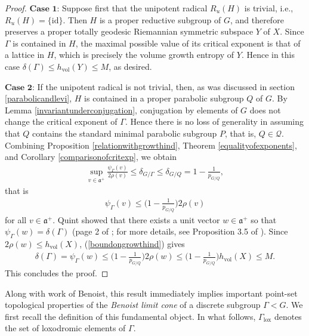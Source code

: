 \documentclass[psamsfonts]{amsart}
\theoremstyle{definition}
\theoremstyle{remark}
\numberwithin{equation}{section}
\begin{document}
\begin{proof}
\par 
$\textbf{Case 1:}$ Suppose first that the unipotent radical $R_{u}(H)$ is trivial, i.e., $R_{u}(H) = \{\mathrm{id}\}$. Then $H$ is a proper reductive subgroup of $G$, and therefore preserves a proper totally geodesic Riemannian symmetric subspace $Y$ of $X$. Since $\Gamma$ is contained in $H$, the maximal possible value of its critical exponent is that of a lattice in $H$, which is precisely the volume growth entropy of $Y$. Hence in this case $\delta(\Gamma) \leq h_{\mathrm{vol}}(Y) \leq M$, as desired.
\par 
$\textbf{Case 2:}$ If the unipotent radical is not trivial, then, as was discussed in section \ref{parabolicandlevi}, $H$ is contained in a proper parabolic subgroup $Q$ of $G$. By Lemma \ref{invariantunderconjugation}, conjugation by elements of $G$ does not change the critical exponent of $\Gamma$. Hence there is no loss of generality in assuming that $Q$ contains the standard minimal parabolic subgroup $P$, that is, $Q \in \mathcal{Q}$. Combining Proposition \ref{relationwithgrowthind}, Theorem \ref{equalityofexponents}, and Corollary \ref{comparisonofcritexp}, we obtain
\begin{align*}
\sup_{v \in \mathfrak{a}^{+}} \frac{\psi_{\Gamma}(v)}{2 \rho (v)} \leq \delta_{G/\Gamma} \leq \delta_{G/Q} = 1 - \frac{1}{p_{G/Q}},
\end{align*} that is
\begin{align}
\label{boundongrowthind}
\psi_{\Gamma}(v) \leq \Big(1 - \frac{1}{p_{G/Q}} \Big) 2 \rho(v)
\end{align} for all $v \in \mathfrak{a}^{+}$. Quint showed that there exists a unit vector $w \in \mathfrak{a}^{+}$ so that $\psi_{\Gamma}(w) = \delta(\Gamma)$ (page 2 of \cite{Q1}; for more details, see Proposition 3.5 of \cite{S1}). Since $2 \rho(w) \leq h_{\mathrm{vol}}(X)$, (\ref{boundongrowthind}) gives
\begin{align*}
\delta(\Gamma) = \psi_{\Gamma}(w) \leq \Big(1 - \frac{1}{p_{G/Q}} \Big) 2 \rho(w) \leq \Big(1 - \frac{1}{p_{G/Q}} \Big) h_{\mathrm{vol}}(X) \leq M.
\end{align*} This concludes the proof.
\end{proof}
Along with work of Benoist, this result immediately implies important point-set topological properties of the \emph{Benoist limit cone} of a discrete subgroup $\Gamma < G$. We first recall the definition of this fundamental object. In what follows, $\Gamma_{\mathrm{lox}}$ denotes the set of loxodromic elements of $\Gamma$.
\end{document}
